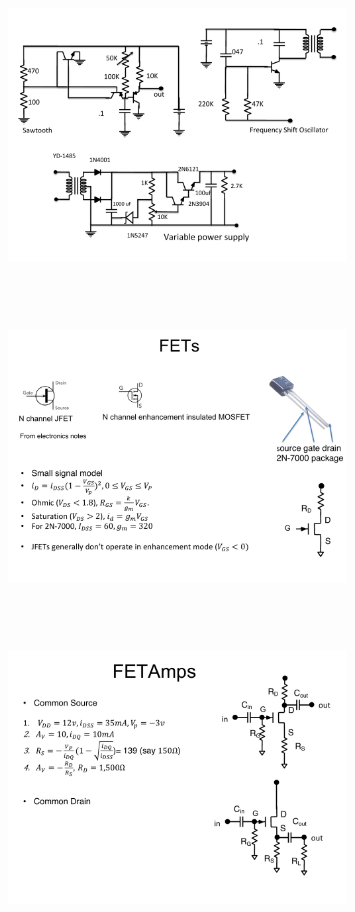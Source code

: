 \begin{figure} 
\center
\includegraphics[width=0.8\textwidth,natwidth=642,natheight=610, height=80mm, width=88mm]{circuit9.pdf}
\end{figure}
\begin{figure} 
\center
\includegraphics[width=0.8\textwidth,natwidth=642,natheight=610, height=80mm, width=88mm]{circuit10.pdf}
\end{figure}
\begin{figure} 
\center
\includegraphics[width=0.8\textwidth,natwidth=642,natheight=610, height=80mm, width=88mm]{circuit11.pdf}
\end{figure}
